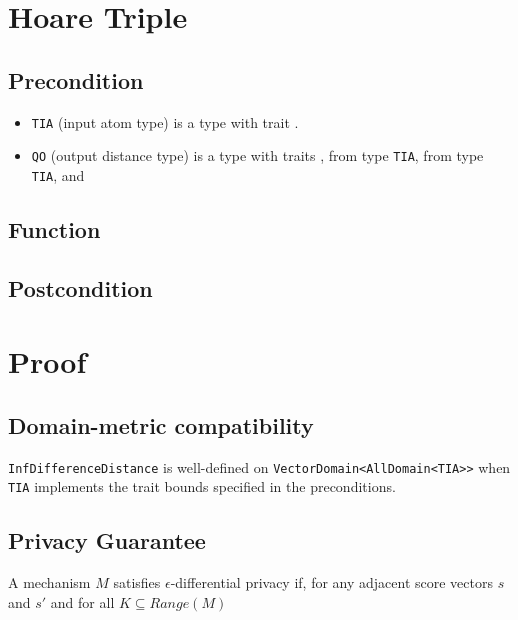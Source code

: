 \documentclass{article}
\begin{document}
\section{Hoare Triple}
\subsection*{Precondition}
\begin{itemize}
    \item \texttt{TIA} (input atom type) is a type with trait .

    \item \texttt{QO} (output distance type) is a type with traits , 
     from type \texttt{TIA}, 
     from type \texttt{TIA}, 
    and 
        
\end{itemize}

\subsection*{Function}
\label{sec:python-pseudocode}


\subsection*{Postcondition}


\section{Proof}
\subsection{Domain-metric compatibility} 
\texttt{InfDifferenceDistance} is well-defined on \texttt{VectorDomain<AllDomain<TIA>>} 
when \texttt{TIA} implements the trait bounds specified in the preconditions.

\subsection{Privacy Guarantee}
\label{privacy-guarantee}
A mechanism $M$ satisfies $\epsilon$-differential privacy if, for any adjacent score vectors $s$ and $s'$ and for all $K \subseteq Range(M)$
\end{document}
